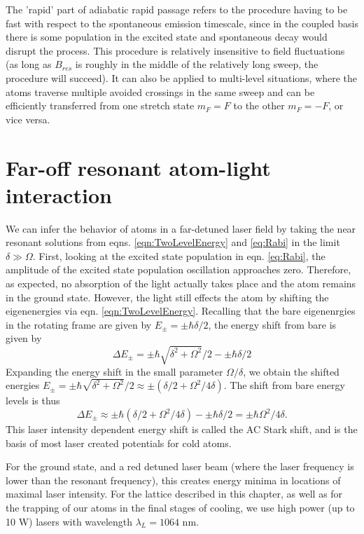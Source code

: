 The 'rapid' part of adiabatic rapid passage refers to the procedure having to be fast with respect to the spontaneous emission timescale, since in the coupled basis there is some population in the excited state and spontaneous decay would disrupt the process. This procedure is relatively insensitive to field fluctuations (as long as $B_{res}$ is roughly in the middle of the relatively long sweep, the procedure will succeed). It can also be applied to multi-level situations, where the atoms traverse multiple avoided crossings in the same sweep and can be efficiently transferred from one stretch state $m_F=F$ to the other $m_F=-F$, or vice versa. 



\section{Far-off resonant atom-light interaction}\label{sec:FoRatomLight}

	We can infer the behavior of atoms in a far-detuned laser field by taking the near resonant solutions from eqns. \ref{eqn:TwoLevelEnergy} and \ref{eq:Rabi} in the limit $\delta \gg \Omega$. First, looking at the excited state population in eqn. \ref{eq:Rabi}, the amplitude of the excited state population oscillation approaches zero. Therefore, as expected, no absorption of the light actually takes place and the atom remains in the ground state. 
	However, the light still effects the atom by shifting the eigenenergies via eqn. \ref{eqn:TwoLevelEnergy}. Recalling that the bare eigenenrgies in the rotating frame are given by $E_{\pm}=\pm \hbar\delta/2$, the energy shift from bare is given by
\begin{equation}
\Delta E_{\pm} = \pm\hbar\sqrt{\delta^2+\Omega^2}/2 -\pm \hbar\delta/2
\end{equation}
Expanding the energy shift in the small parameter $\Omega/\delta$, we obtain the shifted energies $E_{\pm} = \pm \hbar \sqrt{\delta^2 + \Omega^2}/2 \approx \pm (\delta/2 + \Omega^2/4\delta)$. The shift from bare energy levels is thus 
\begin{equation}
\Delta E_{\pm} \approx \pm \hbar(\delta/2 + \Omega^2/4\delta)-\pm \hbar\delta/2 = \pm \hbar \Omega^2/4\delta.
\end{equation}
This laser intensity dependent energy shift is called the AC Stark shift, and is the basis of most laser created potentials for cold atoms. 
	
For the ground state, and a red detuned laser beam (where the laser frequency is lower than the resonant frequency), this creates energy minima in locations of maximal laser intensity. For the lattice described in this chapter, as well as for the trapping of our atoms in the final stages of cooling, we use high power (up to 10 W) lasers with wavelength $\lambda_L = 1064 $ nm. 

